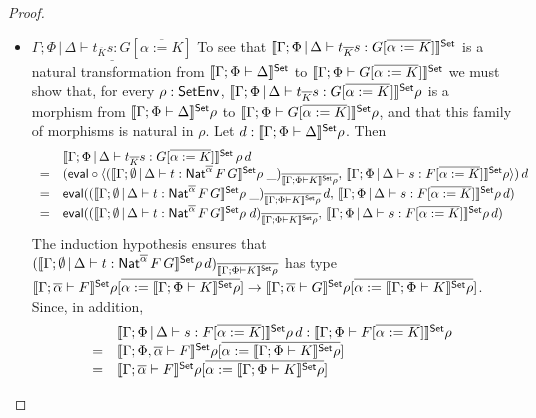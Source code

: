 \documentclass[acmsmall,review,anonymous]{acmart}
\theoremstyle{definition}
\begin{document}
\begin{proof}
\begin{itemize}
\item 
$\underline{\Gamma;\Phi \,|\, \Delta \vdash t_{\overline K} s: G
  [\overline{\alpha := K}]}$\; 
  To see that $\llbracket{\Gamma;\Phi \,|\,
  \Delta \vdash t_{\overline K} s: G [\overline{\alpha := K}]}\rrbracket^{\mathsf{Set}}$ is a
  natural transformation from $\llbracket{\Gamma; \Phi \vdash \Delta}\rrbracket^{\mathsf{Set}}$ to
  $\llbracket{\Gamma;\Phi \vdash G [\overline{\alpha := K}]}\rrbracket^{\mathsf{Set}}$ we must
  show that, for every $\rho : \mathsf{SetEnv}$, $\llbracket{\Gamma;\Phi \,|\,
    \Delta \vdash t_{\overline K} s: G [\overline{\alpha := K}]}\rrbracket^{\mathsf{Set}}\rho$
  is a morphism from $\llbracket{\Gamma; \Phi \vdash \Delta}\rrbracket^{\mathsf{Set}}\rho$ to
  $\llbracket{\Gamma;\Phi \vdash G [\overline{\alpha := K}]}\rrbracket^{\mathsf{Set}}\rho$, and
  that this family of morphisms is natural in $\rho$. Let $d :
  \llbracket{\Gamma; \Phi \vdash \Delta}\rrbracket^{\mathsf{Set}}\rho$. Then
  \[\begin{array}{ll}
  & \llbracket{\Gamma;\Phi \,|\, \Delta \vdash t_{\overline K} s: G
  [\overline{\alpha := K}]}\rrbracket^{\mathsf{Set}}\,\rho\,d\\
= & (\mathsf{eval} \circ \langle (\llbracket{\Gamma; \emptyset \,|\, \Delta \vdash
  t : \mathsf{Nat}^{\overline{\alpha}} \,F \,G}\rrbracket^{\mathsf{Set}}\rho\;
\_)_{\overline{\llbracket{\Gamma;\Phi \vdash K}\rrbracket^{\mathsf{Set}}\rho}},\,
\llbracket{\Gamma;\Phi \,|\, \Delta \vdash s: F [\overline{\alpha :=
      K}]}\rrbracket^{\mathsf{Set}}\rho \rangle)\,d\\
= & \mathsf{eval} ((\llbracket{\Gamma; \emptyset \,|\, \Delta \vdash t :
  \mathsf{Nat}^{\overline{\alpha}} \,F \,G}\rrbracket^{\mathsf{Set}}\rho\;
\_)_{\overline{\llbracket{\Gamma;\Phi \vdash K}\rrbracket^{\mathsf{Set}}\rho}} \,d,\,
\llbracket{\Gamma;\Phi \,|\, \Delta \vdash s: F [\overline{\alpha :=
      K}]}\rrbracket^{\mathsf{Set}}\rho\, d)\\
= & \mathsf{eval} ((\llbracket{\Gamma; \emptyset \,|\, \Delta \vdash t :
  \mathsf{Nat}^{\overline{\alpha}} \,F \,G}\rrbracket^{\mathsf{Set}}\rho\;
d)_{\overline{\llbracket{\Gamma;\Phi \vdash K}\rrbracket^{\mathsf{Set}}\rho}},\,
\llbracket{\Gamma;\Phi \,|\, \Delta \vdash s: F [\overline{\alpha :=
      K}]}\rrbracket^{\mathsf{Set}}\rho\, d)\\
\end{array}\]
The induction hypothesis ensures that $(\llbracket{\Gamma; \emptyset \,|\,
  \Delta \vdash t : \mathsf{Nat}^{\overline{\alpha}} \,F \,G}\rrbracket^{\mathsf{Set}}\rho\,
d)_{\overline{\llbracket{\Gamma;\Phi \vdash K}\rrbracket^{\mathsf{Set}}\rho}}$ has type
$\llbracket{\Gamma; \overline{\alpha} \vdash F}\rrbracket^{\mathsf{Set}}\rho[\overline{\alpha :=
    \llbracket{\Gamma;\Phi \vdash K}\rrbracket^{\mathsf{Set}}\rho}] \to \llbracket{\Gamma;
  \overline{\alpha} \vdash G}\rrbracket^{\mathsf{Set}}\rho[\overline{\alpha := \llbracket{\Gamma;\Phi \vdash
      K}\rrbracket^{\mathsf{Set}}\rho}]$.  Since, in addition, 
\[\begin{array}{ll}
  &\llbracket{\Gamma;\Phi \,|\,
  \Delta \vdash s: F [\overline{\alpha := K}]}\rrbracket^{\mathsf{Set}}\rho\, d :
\llbracket{\Gamma; \Phi \vdash F[\overline{\alpha := K}]}\rrbracket^{\mathsf{Set}}\rho \\ 
  =&\llbracket{\Gamma; \Phi, \overline{\alpha} \vdash F}\rrbracket^{\mathsf{Set}}\rho[\overline{\alpha :=
    \llbracket{\Gamma;\Phi \vdash K}\rrbracket^{\mathsf{Set}}\rho}] \\
    =& \llbracket{\Gamma;
  \overline{\alpha} \vdash F}\rrbracket^{\mathsf{Set}}\rho[\overline{\alpha := \llbracket{\Gamma;\Phi \vdash
      K}\rrbracket^{\mathsf{Set}}\rho}] 
\end{array}\]
      

\end{itemize}
\end{proof}
\end{document}
